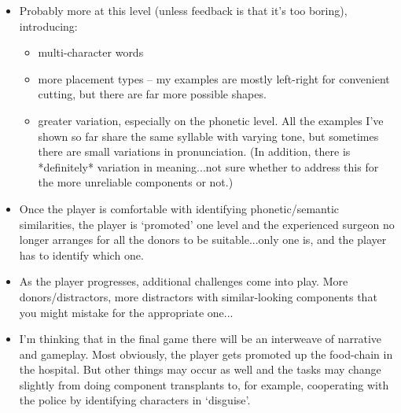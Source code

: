 \documentclass{article}
\begin{document}
\begin{itemize}
  \item Probably more at this level (unless feedback is that it's too boring), introducing:
    \begin{itemize}
      \item multi-character words
      \item more placement types -- my examples are mostly left-right for convenient cutting, but there are far more possible shapes.
      \item greater variation, especially on the phonetic level. All the examples I've shown so far share the same syllable with varying tone, but sometimes there are small variations in pronunciation. (In addition, there is *definitely* variation in meaning...not sure whether to address this for the more unreliable components or not.)
    \end{itemize}
  \item Once the player is comfortable with identifying phonetic/semantic similarities, the player is `promoted' one level and the experienced surgeon no longer arranges for all the donors to be suitable...only one is, and the player has to identify which one.
  \item As the player progresses, additional challenges come into play. More donors/distractors, more distractors with similar-looking components that you might mistake for the appropriate one...
  \item I'm thinking that in the final game there will be an interweave of narrative and gameplay. Most obviously, the player gets promoted up the food-chain in the hospital. But other things may occur as well and the tasks may change slightly from doing component transplants to, for example, cooperating with the police by identifying characters in `disguise'.
\end{itemize}
\end{document}
